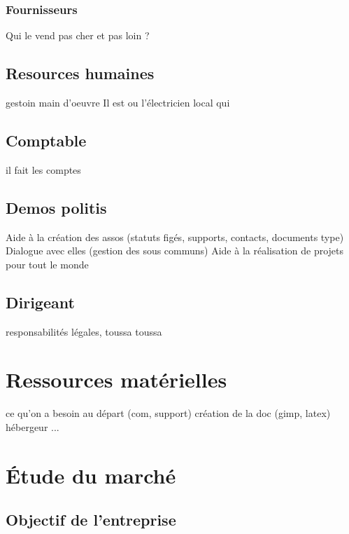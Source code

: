 \documentclass[10pt]{article}
\begin{document}
\subsubsection{Fournisseurs}
\label{ssub:}

Qui le vend pas cher et pas loin ?


\subsection{Resources humaines}
\label{sec:rh}
gestoin main d'oeuvre
Il est ou l'électricien local qui

\subsection{Comptable}
\label{sec:}
il fait les comptes

\subsection{Demos politis}
\label{sec:}
Aide à la création des assos (statuts figés, supports, contacts, documents type)
Dialogue avec elles (gestion des sous communs)
Aide à la réalisation de projets pour tout le monde

\subsection{Dirigeant}
\label{sec:dirigeant}
responsabilités légales, toussa toussa


\section{Ressources matérielles}
\label{sec:ressources}
ce qu'on a besoin au départ (com, support)
création de la doc (gimp, latex)
hébergeur ...

\section{Étude du marché}
\label{sec:marche}

\subsection{Objectif de l'entreprise}
\label{sec:objectifs}
\end{document}
